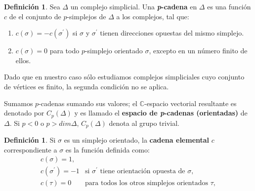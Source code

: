 \documentclass[12pt]{book}
\theoremstyle{definition}
\newtheorem{definition}[theorem]{Definición}
\newcounter{in}
\newcounter{ini}
\begin{document}
{\begin{center}
\end{center}

\begin{center}
\end{center}

\begin{definition}
  Sea $\Delta$ un complejo simplicial. Una \textbf{\emph{p}-cadena} en
  $\Delta$ es una función $c$ de el conjunto de $p$-simplejos de
  $\Delta$ a los complejos, tal que:
  \begin{enumerate}
    \item $c(\sigma)=-c(\sigma^{'})$ si $\sigma$ y $\sigma^{'}$ tienen
      direcciones opuestas del mismo simplejo.
    \item $c(\sigma)=0$ para todo $p$-simplejo orientado $\sigma$,
      excepto en un número finito de ellos.
  \end{enumerate} 
\end{definition}

Dado que en nuestro caso sólo estudiamos complejos simpliciales cuyo
conjunto de vértices es finito, la segunda condición no se aplica.

Sumamos $p$-cadenas sumando sus valores; el $\mathbb{C}$-espacio vectorial resultante es
denotado por $C_{p}(\Delta)$ y es llamado el \textbf{espacio de
  \emph{p}-cadenas (orientadas)} de $\Delta$. Si $p<0$ o $p>dim \Delta$,
$C_{p}(\Delta)$ denota al grupo trivial.

\begin{definition}
  Si $\sigma$ es un simplejo orientado, la \textbf{cadena elemental} $c$
  correspondiente a $\sigma$ es la función definida como:
  \[ 
  \begin{array}{cl}
    c(\sigma)=1, & \\
    c(\sigma^{'})=-1 & \mbox{si $\sigma^{'}$ tiene orientación opuesta de $\sigma$}, \\
    c(\tau)=0 & \mbox{para todos los otros simplejos orientados $\tau$}, 
  \end{array}\] 
  \end{definition}

}
\end{document}
